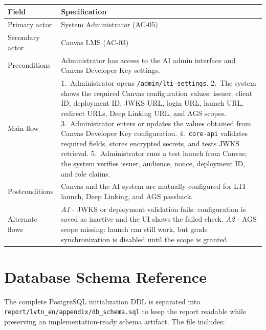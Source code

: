 \begin{longtable}{|p{3.2cm}|p{10.3cm}|}
\hline
\textbf{Field} & \textbf{Specification} \\
\hline
\endhead
Primary actor & System Administrator (AC-05) \\
\hline
Secondary actor & Canvas LMS (AC-03) \\
\hline
Preconditions & Administrator has access to the AI admin interface and
    Canvas Developer Key settings. \\
\hline
Main flow &
    1.\ Administrator opens \texttt{/admin/lti-settings}.
    2.\ The system shows the required Canvas configuration values:
    issuer, client ID, deployment ID, JWKS URL, login URL, launch URL,
    redirect URLs, Deep Linking URL, and AGS scopes.
    3.\ Administrator enters or updates the values obtained from
    Canvas Developer Key configuration.
    4.\ \texttt{core-api} validates required fields, stores encrypted
    secrets, and tests JWKS retrieval.
    5.\ Administrator runs a test launch from Canvas; the system
    verifies issuer, audience, nonce, deployment ID, and role claims. \\
\hline
Postconditions & Canvas and the AI system are mutually configured for
    LTI launch, Deep Linking, and AGS passback. \\
\hline
Alternate flows &
    \emph{A1} - JWKS or deployment validation fails: configuration is
    saved as inactive and the UI shows the failed check.
    \emph{A2} - AGS scope missing: launch can still work, but grade
    synchronization is disabled until the scope is granted. \\
\hline
\end{longtable}

\section{Database Schema Reference}
\label{appendix:db-schema}

The complete PostgreSQL initialization DDL is separated into
\texttt{report/lvtn\_en/appendix/db\_schema.sql} to keep the report
readable while preserving an implementation-ready schema artifact. The
file includes:

